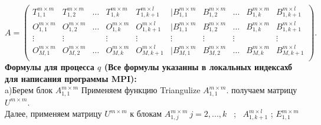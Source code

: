 \documentclass[a4paper,12pt]{article}
\begin{document}
\begin{equation*}
A = 
\begin{pmatrix}
T_{1,1}^{m \times m} & T_{1,2}^{m \times m} & \dots & T_{1,k}^{m \times m} & T_{1,k+1}^{m \times l} & | B_{1,1}^{m \times m} & B_{1,2}^{m \times m} & \dots & B_{1,k}^{m\times m} & B_{1,k+1}^{m \times l}\\
O_{1,1}^{m \times m} & O_{1,2}^{m \times m} & \dots & O_{1,k}^{m \times m} & O_{1,k+1}^{m \times l} & | B_{1,1}^{m \times m} & B_{1,2}^{m \times m} & \dots & B_{1,k}^{m\times m} & B_{1,k+1}^{m \times l}\\
\vdots & \vdots &  & \vdots & \vdots &\vdots  &\vdots   &\vdots  & \  &\vdots \\
O_{M,1}^{m \times m} & O_{M,2}^{m \times m} & \dots & O_{M,k}^{m \times m} & O_{M,k+1}^{m \times l}& | B_{M,1}^{m \times m} & B_{M,2}^{m \times m} & \dots & B_{M,k}^{m\times m} & B_{M,k+1}^{m \times l}\\
\end{pmatrix}.
\end{equation*}
\textbf{ Формулы для процесса $q$ (Все формулы указанны в локальных индексахб для написания программы MPI):} \\

\hspace{0.25cm} a)Берем блок $A_{1,1}^{m\times m}$ Применяем функцию Triangulize $A_{1,1}^{m\times m} $. получаем матрицу $U^{m\times m}$. \\
Далее, применяем матрицу $U^{m\times m}$ к блокам $A_{1,j}^{m\times m} \ j = 2,...,k$ \ ; \ $A_{1,k+1}^{m\times l} $ ; $E_{1,1}^{m\times m}$ \\
\end{document}
